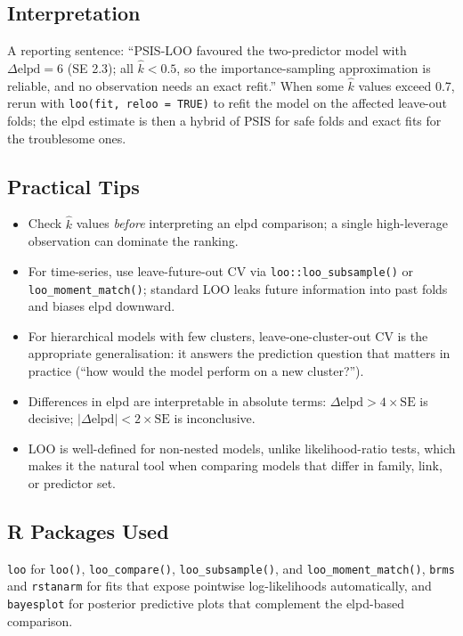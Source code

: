 \documentclass[
]{article}
\providecommand{\tightlist}{%
  \setlength{\itemsep}{0pt}\setlength{\parskip}{0pt}}
\begin{document}
\subsection{Interpretation}\label{interpretation}

A reporting sentence: ``PSIS-LOO favoured the two-predictor model with
\(\Delta\mathrm{elpd} = 6\) (SE 2.3); all \(\hat k < 0.5\), so the
importance-sampling approximation is reliable, and no observation needs
an exact refit.'' When some \(\hat k\) values exceed 0.7, rerun with
\texttt{loo(fit,\ reloo\ =\ TRUE)} to refit the model on the affected
leave-out folds; the elpd estimate is then a hybrid of PSIS for safe
folds and exact fits for the troublesome ones.

\subsection{Practical Tips}\label{practical-tips}

\begin{itemize}
\tightlist
\item
  Check \(\hat k\) values \emph{before} interpreting an elpd comparison;
  a single high-leverage observation can dominate the ranking.
\item
  For time-series, use leave-future-out CV via
  \texttt{loo::loo\_subsample()} or \texttt{loo\_moment\_match()};
  standard LOO leaks future information into past folds and biases elpd
  downward.
\item
  For hierarchical models with few clusters, leave-one-cluster-out CV is
  the appropriate generalisation: it answers the prediction question
  that matters in practice (``how would the model perform on a new
  cluster?'').
\item
  Differences in elpd are interpretable in absolute terms:
  \(\Delta\mathrm{elpd} > 4 \times \mathrm{SE}\) is decisive;
  \(|\Delta\mathrm{elpd}| < 2 \times \mathrm{SE}\) is inconclusive.
\item
  LOO is well-defined for non-nested models, unlike likelihood-ratio
  tests, which makes it the natural tool when comparing models that
  differ in family, link, or predictor set.
\end{itemize}

\subsection{R Packages Used}\label{r-packages-used}

\texttt{loo} for \texttt{loo()}, \texttt{loo\_compare()},
\texttt{loo\_subsample()}, and \texttt{loo\_moment\_match()},
\texttt{brms} and \texttt{rstanarm} for fits that expose pointwise
log-likelihoods automatically, and \texttt{bayesplot} for posterior
predictive plots that complement the elpd-based comparison.
\end{document}
